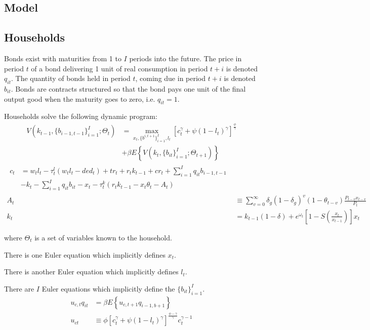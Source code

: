 \documentclass[letterpaper,11pt]{article}
\theoremstyle{definition}
\numberwithin{equation}{section}
\begin{document}
\begin{spacing}{1.5}

\section{Model} \label{sec_Model}

	\subsection{Households}

		Bonds exist with maturities from 1 to $I$ periods into the future.  The price in period $t$ of a bond delivering 1 unit of real consumption in period $t+i$ is denoted $q_{it}$.  The quantity of bonds held in period $t$, coming due in period $t+i$ is denoted $b_{it}$.  Bonds are contracts structured so that the bond pays one unit of the final output good when the maturity goes to zero, i.e. $q_{it} = 1$.

		Households solve the following dynamic program:
		\begin{align}
			V(k_{t-1}, \{b_{i-1,t-1}\}_{i=1}^I; \Theta_t) & = \max_{x_t, \{b^{i,t+1}\}_{i=1}^I, l_t} [c_t^\gamma + \psi(1-l_t)^\gamma]^{\frac{\phi}{\gamma}} \nonumber \\
			& + \beta E \left\{ V(k_t, \{b_{it}\}_{i=1}^I; \Theta_{t+1}) \right\} \nonumber
		\end{align}
		\begin{align}
			\begin{split} c_t & = w_t l_t - \tau^l_t (w_t l_t - ded_t) + tr_t + r_t k_{t-1} + cr_t + \sum_{i=1}^I q_{it} b_{i-1,t-1} \\
			& - k_t - \sum_{i=1}^I  q_{it} b_{it} - x_t - \tau^k_t \left( r_t k_{t-1} - x_t\theta_t - A_t  \right) \end{split} \\
			A_t & \equiv \sum_{v=0}^\infty \delta_g (1-\delta_g)^v (1-\theta_{t-v}) \frac{P_{t-v} x_{t-v}}{P_t} \\
			k_t & = k_{t-1} (1-\delta) + e^{\omega_t} \left[ 1-S\left(\frac{x_t}{x_{t-1}} \right) \right] x_t 
		\end{align}
		
		where $\Theta_t$ is a set of variables known to the household.

		There is one Euler equation which implicitly defines $x_t$.

		There is another Euler equation which implicitly defines $l_t$.

		There are $I$ Euler equations which implicitly define the $\{b_{it}\}_{i=1}^I$.
		\begin{align}
			u_{c,t} q_{it} & = \beta E\left\{  u_{c,t+1} q_{i-1,b+1} \right\} \\
			u_{ct} & \equiv \phi [ c_t^\gamma + \psi(1-l_t)^\gamma]^{\frac{\phi-\gamma}{\gamma}} c_t^{\gamma-1} \label{eq_bEuler}
		\end{align}



\end{spacing}
\end{document}
